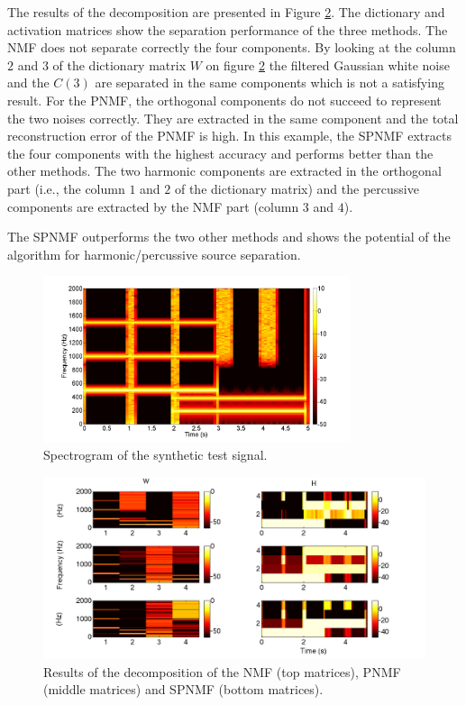\documentclass[journal]{IEEEtran}
\begin{document}
The results of the decomposition are presented in Figure \ref{resultONMF2}. The dictionary and activation matrices show the separation performance of the three methods. The NMF does not separate correctly the four components. 
By looking at the column $2$ and $3$ of the dictionary matrix $W$ on figure \ref{resultONMF2} the filtered Gaussian white noise and the $C(3)$ are separated in the same components which is not a satisfying result.
For the PNMF, the orthogonal components do not succeed to represent the two noises correctly. They are extracted in the same component and the total reconstruction error of the PNMF is high.
In this example, the SPNMF extracts the four components with the highest accuracy and performs better than the other methods. The two harmonic components are extracted in the orthogonal part (i.e., the column $1$ and $2$ of the dictionary matrix) and the percussive components are extracted by the NMF part (column $3$ and $4$).

The SPNMF outperforms the two other methods and shows the potential of the algorithm for harmonic/percussive source separation.
%

\begin{figure}[htb]

  \centering 
  \includegraphics[width=9cm]{fig/synthetictestspectrogram.png}
  \caption{\label{SpectroSynth} Spectrogram of the synthetic test signal.}
  
\end{figure}

\begin{figure}
   
	\centering    
  \includegraphics[width=15cm]{fig/WHcomp.png}

\caption{\label{resultONMF2} Results of the decomposition of the NMF (top matrices), PNMF (middle matrices) and SPNMF (bottom matrices).}


\end{figure}
\end{document}
